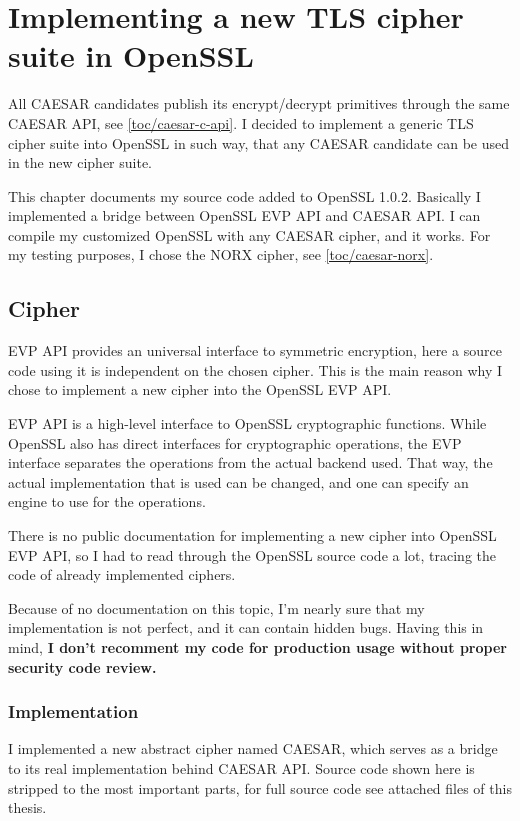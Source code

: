 \chapter{Implementing a new TLS cipher suite in OpenSSL}

All CAESAR candidates publish its encrypt/decrypt primitives through the same CAESAR API, see \autoref{toc/caesar-c-api}. I decided to implement a generic TLS cipher suite into OpenSSL in such way, that any CAESAR candidate can be used in the new cipher suite.

This chapter documents my source code added to OpenSSL 1.0.2. Basically I implemented a bridge between OpenSSL EVP API and CAESAR API. I can compile my customized OpenSSL with any CAESAR cipher, and it works. For my testing purposes, I chose the NORX cipher, see \autoref{toc/caesar-norx}.

\section{Cipher}

EVP API provides an universal interface to symmetric encryption, here a source code using it is independent on the chosen cipher. This is the main reason why I chose to implement a new cipher into the OpenSSL EVP API.

EVP API is a high-level interface to OpenSSL cryptographic functions. While OpenSSL also has direct interfaces for cryptographic operations, the EVP interface separates the operations from the actual backend used. That way, the actual implementation that is used can be changed, and one can specify an engine to use for the operations.

There is no public documentation for implementing a new cipher into OpenSSL EVP API, so I had to read through the OpenSSL source code a lot, tracing the code of already implemented ciphers.

Because of no documentation on this topic, I'm nearly sure that my implementation is not perfect, and it can contain hidden bugs. Having this in mind, \textbf{I don't recomment my code for production usage without proper security code review.}

\subsection{Implementation}

I implemented a new abstract cipher named CAESAR, which serves as a bridge to its real implementation behind CAESAR API. Source code shown here is stripped to the most important parts, for full source code see attached files of this thesis.

